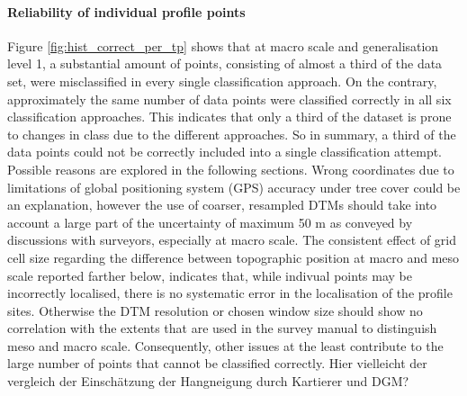 \documentclass[final,1p,times,twocolumn,authoryear]{elsarticle}
\begin{document}
\paragraph{Reliability of individual profile points} 
Figure \ref{fig:hist_correct_per_tp} shows that at macro scale and generalisation level 1, a substantial amount of points, consisting of almost a third of the data set, were misclassified in every single classification approach. On the contrary, approximately the same number of data points were classified correctly in all six classification approaches. This indicates that only a third of the dataset is prone to changes in class due to the different approaches. So in summary, a third of the data points could not be correctly included into a single classification attempt. Possible reasons are explored in the following sections. Wrong coordinates due to limitations of global positioning system (GPS) accuracy under tree cover could be an explanation, however the use of coarser, resampled DTMs should take into account a large part of the uncertainty of maximum 50 m as conveyed by discussions with surveyors, especially at macro scale. The consistent effect of grid cell size regarding the difference between topographic position at macro and meso scale reported farther below, indicates that, while indivual points may be incorrectly localised, there is no systematic error in the localisation of the profile sites. Otherwise the DTM resolution or chosen window size should show no correlation with the extents that are used in the survey manual to distinguish meso and macro scale. Consequently, other issues at the least contribute to the large number of points that cannot be classified correctly. 
Hier vielleicht der vergleich der Einschätzung der Hangneigung durch Kartierer und DGM?
\end{document}
